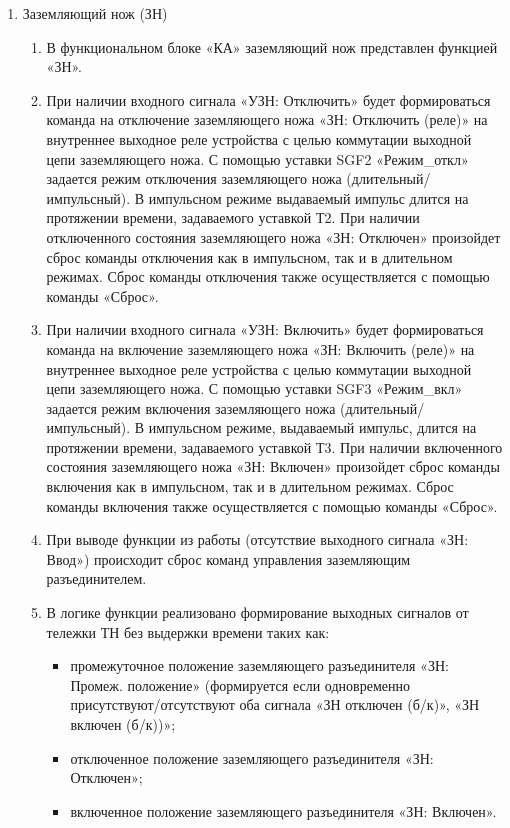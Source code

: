 \begin{enumerate}
\begin{enumerate}
\end{enumerate}


\item Заземляющий нож (ЗН)

\begin{enumerate}

\item
В функциональном блоке «КА» заземляющий нож представлен функцией «ЗН». 

\item
При наличии входного сигнала «УЗН: Отключить» будет формироваться команда на отключение заземляющего ножа «ЗН: Отключить (реле)» на внутреннее выходное реле устройства с целью коммутации выходной цепи заземляющего ножа. С помощью уставки SGF2 «Режим\_откл» задается режим отключения заземляющего ножа (длительный/импульсный). В импульсном режиме выдаваемый импульс длится на протяжении времени, задаваемого уставкой Т2. При наличии отключенного состояния заземляющего ножа «ЗН: Отключен» произойдет сброс команды отключения как в импульсном, так и в длительном режимах. Сброс команды отключения также осуществляется с помощью команды «Сброс».

\item
При наличии входного сигнала «УЗН: Включить» будет формироваться команда на включение заземляющего ножа «ЗН: Включить (реле)» на внутреннее выходное реле устройства с целью коммутации выходной цепи заземляющего ножа. С помощью уставки SGF3 «Режим\_вкл» задается режим включения заземляющего ножа (длительный/импульсный). В импульсном режиме, выдаваемый импульс, длится на протяжении времени, задаваемого уставкой Т3. При наличии включенного состояния заземляющего ножа «ЗН: Включен» произойдет сброс команды включения как в импульсном, так и в длительном режимах. Сброс команды включения также осуществляется с помощью команды «Сброс».

\item
При выводе функции из работы (отсутствие выходного сигнала «ЗН: Ввод») происходит сброс команд управления заземляющим разъединителем.

\item
В логике функции реализовано формирование выходных сигналов от тележки ТН без выдержки времени таких как:
\begin{itemize}
    \item промежуточное положение заземляющего разъединителя «ЗН: Промеж. положение» (формируется если одновременно присутствуют/отсутствуют оба сигнала «ЗН отключен (б/к)», «ЗН включен (б/к))»;
    \item отключенное положение заземляющего разъединителя «ЗН: Отключен»;
    \item включенное положение заземляющего разъединителя «ЗН: Включен».
\end{itemize}


\end{enumerate}
\end{enumerate}
